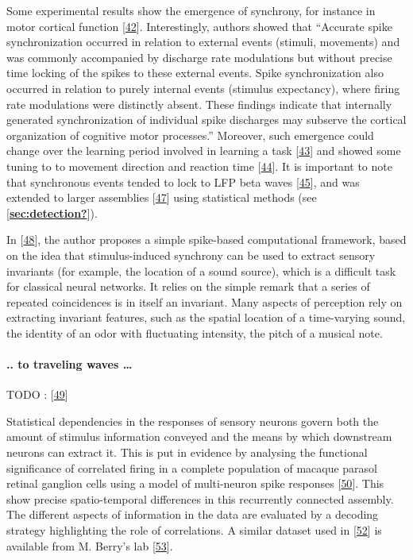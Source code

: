 Some experimental results show the emergence of synchrony, for instance in motor cortical function {[}\protect\hyperlink{ref-wVZpQvSk}{42}{]}. Interestingly, authors showed that ``Accurate spike synchronization occurred in relation to external events (stimuli, movements) and was commonly accompanied by discharge rate modulations but without precise time locking of the spikes to these external events. Spike synchronization also occurred in relation to purely internal events (stimulus expectancy), where firing rate modulations were distinctly absent. These findings indicate that internally generated synchronization of individual spike discharges may subserve the cortical organization of cognitive motor processes.'' Moreover, such emergence could change over the learning period involved in learning a task {[}\protect\hyperlink{ref-1HJjmmSpm}{43}{]} and showed some tuning to to movement direction and reaction time {[}\protect\hyperlink{ref-FZ9X31Qa}{44}{]}. It is important to note that synchronous events tended to lock to LFP beta waves {[}\protect\hyperlink{ref-Ejy1sAyh}{45}{]}, and was extended to larger assemblies {[}\protect\hyperlink{ref-Glu4NlLC}{47}{]} using statistical methods (see {[}\protect\hyperlink{ref-sec:detection}{\textbf{sec:detection?}}{]}).

In {[}\protect\hyperlink{ref-3GlNNxH5}{48}{]}, the author proposes a simple spike-based computational framework, based on the idea that stimulus-induced synchrony can be used to extract sensory invariants (for example, the location of a sound source), which is a difficult task for classical neural networks. It relies on the simple remark that a series of repeated coincidences is in itself an invariant. Many aspects of perception rely on extracting invariant features, such as the spatial location of a time-varying sound, the identity of an odor with fluctuating intensity, the pitch of a musical note.

\hypertarget{to-traveling-waves}{%
\paragraph{.. to traveling waves \ldots{}}\label{to-traveling-waves}}

TODO : {[}\protect\hyperlink{ref-zNDCo9Hy}{49}{]}

Statistical dependencies in the responses of sensory neurons govern both the amount of stimulus information conveyed and the means by which downstream neurons can extract it. This is put in evidence by analysing the functional significance of correlated firing in a complete population of macaque parasol retinal ganglion cells using a model of multi-neuron spike responses {[}\protect\hyperlink{ref-Piao2Wzf}{50}{]}. This show precise spatio-temporal differences in this recurrently connected assembly. The different aspects of information in the data are evaluated by a decoding strategy highlighting the role of correlations. A similar dataset used in {[}\protect\hyperlink{ref-2AsQOOsE}{52}{]} is available from M. Berry's lab {[}\protect\hyperlink{ref-1FU0Y7Erc}{53}{]}.

